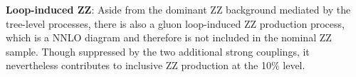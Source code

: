 \textbf{Loop-induced ZZ}: Aside from the dominant ZZ background mediated by the tree-level processes, there is also a gluon loop-induced ZZ production process, which is a NNLO diagram and therefore is not included in the nominal ZZ sample. Though suppressed by the two additional strong couplings, it nevertheless contributes to inclusive ZZ production at the 10\% level.
